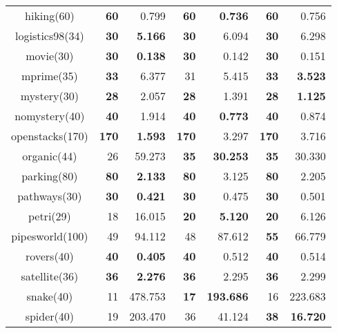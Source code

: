 \begin{center}
\begin{tabular}{c rr rr rr}
    hiking(60)      & \textbf{60}   & 0.799             & \textbf{60}   & \textbf{0.736}      & \textbf{60}   & 0.756 \\
    logistics98(34) & \textbf{30}   & \textbf{5.166}    & \textbf{30}   & 6.094               & \textbf{30}   & 6.298 \\
    movie(30)       & \textbf{30}   & \textbf{0.138}    & \textbf{30}   & 0.142               & \textbf{30}   & 0.151 \\
    mprime(35)      & \textbf{33}   & 6.377             & 31            & 5.415               & \textbf{33}   & \textbf{3.523} \\
    mystery(30)     & \textbf{28}   & 2.057             & \textbf{28}   & 1.391               & \textbf{28}   & \textbf{1.125} \\
    nomystery(40)   & \textbf{40}   & 1.914             & \textbf{40}   & \textbf{0.773}      & \textbf{40}   & 0.874 \\
    openstacks(170) & \textbf{170}  & \textbf{1.593}    & \textbf{170}  & 3.297               & \textbf{170}  & 3.716 \\
    organic(44)     & 26            & 59.273            & \textbf{35}   & \textbf{30.253}     & \textbf{35}   & 30.330 \\
    parking(80)     & \textbf{80}   & \textbf{2.133}    & \textbf{80}   & 3.125               & \textbf{80}   & 2.205 \\
    pathways(30)    & \textbf{30}   & \textbf{0.421}    & \textbf{30}   & 0.475               & \textbf{30}   & 0.501 \\
    petri(29)       & 18            & 16.015            & \textbf{20}   & \textbf{5.120}      & \textbf{20}   & 6.126 \\
    pipesworld(100) & 49            & 94.112            & 48            & 87.612              & \textbf{55}   & 66.779 \\
    rovers(40)      & \textbf{40}   & \textbf{0.405}    & \textbf{40}   & 0.512               & \textbf{40}   & 0.514 \\
    satellite(36)   & \textbf{36}   & \textbf{2.276}    & \textbf{36}   & 2.295               & \textbf{36}   & 2.299 \\
    snake(40)       & 11            & 478.753           & \textbf{17}   & \textbf{193.686}    & 16            & 223.683 \\
    spider(40)      & 19            & 203.470           & 36            & 41.124              & \textbf{38}   & \textbf{16.720} \\

\end{tabular}
\end{center}
